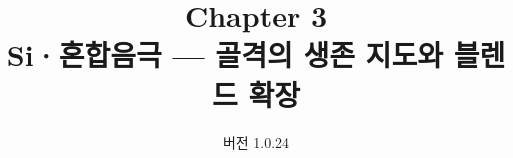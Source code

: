 


\renewcommand{\theequation}{3.\arabic{equation}}
\renewcommand{\thesection}{3.\arabic{section}}

\title{\textbf{\LARGE Chapter 3}\\[0.35em]\Large Si·혼합음극 --- 골격의 생존 지도와 블렌드 확장}
\author{}
\date{\normalsize 버전 1.0.24}


\maketitle










